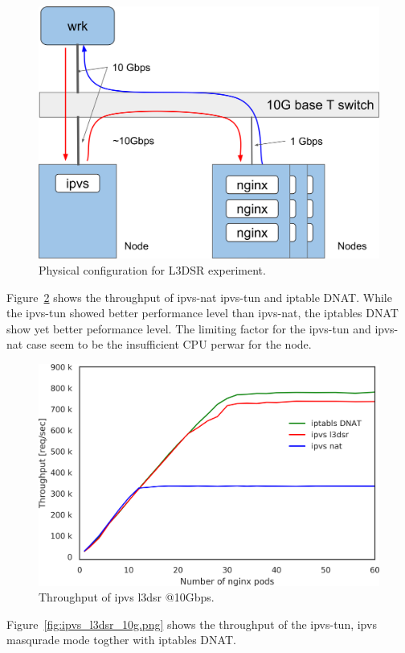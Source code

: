 \begin{figure}[h]
  \centering
  \includegraphics[width=0.8\columnwidth]{Figs/bench_10g_l3dsr}
  \caption{Physical configuration for L3DSR experiment.}
  \label{fig:bench_10g_l3dsr}
\end{figure}

Figure~\ref{fig:ipvs_l3dsr_10g} shows the throughput of ipvs-nat ipvs-tun and iptable DNAT.
While the ipvs-tun showed better performance level than ipvs-nat, the iptables DNAT show yet better peformance level.
The limiting factor for the ipvs-tun and ipvs-nat case seem to be the insufficient CPU perwar for the node.
 


\begin{figure}[h]
  \centering
  \includegraphics[width=0.8\columnwidth]{Figs/ipvs_l3dsr_10g}
  \caption{Throughput of ipvs l3dsr @10Gbps.}
  \label{fig:ipvs_l3dsr_10g}
\end{figure}

Figure~\ref{fig:ipvs_l3dsr_10g.png} shows the throughput of the ipvs-tun, ipvs masqurade mode togther with iptables DNAT.

